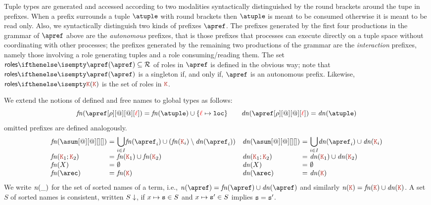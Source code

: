 Tuple types are generated and accessed according to two modalities
syntactically distinguished by the round brackets around the tupe
in prefixes.
%
When a prefix surrounds a tuple $\atuple$ with round brackets then
$\atuple$ is meant to be consumed otherwise it is meant to be read
only.
%
Also, we syntactically distinguish two kinds of prefixes $\apref$.
%
The prefixes generated by the first four productions in the grammar of
$\apref$ above are the \emph{autonomous} prefixes, that is those
prefixes that processes can execute directly on a tuple space without
coordinating with other processes; the prefixes generated by the
remaining two productions of the grammar are the \emph{interaction}
prefixes, namely those involving a role generating tuples and a role
consuming/reading them.
%
The set $\roles \apref \subseteq \roleset$ of roles in $\apref$ is
defined in the obvious way; note that $\roles \apref$ is a singleton
if, and only if, $\apref$ is an autonomous prefix.
%
Likewise, $\roles \aK$ is the set of roles in
$\aK$.

We extend the notions of defined and free names to global types as
follows:
\[
 \fn{\apref[\arole][@][@][\alocvar]}
 = \fn \atuple \cup \{\alocvar \mapsto \asort[loc]\} 
\qquad
 \dn{\apref[\arole][@][@][\alocvar]} 
 = \dn \atuple 
\]
omitted prefixes are defined analogously.
\[
  \begin{array}{ll}
    \begin{array}{l@{\ =\ } ll}
      \fn{\asum[@][@][][]} & \displaystyle{\bigcup_{i\in I}} \fn{\apref_i} \cup (\fn{\aK_i}\setminus\dn{\apref_i})
      \\
      \fn{\aK_1; \aK_2} 
                &
                  \fn{\aK_1}\cup\fn{\aK_2}
      \\
      \fn X & \emptyset
      \\
      \fn \arec & \fn {\aK}
    \end{array}
    \begin{array}{l@{\ =\ } ll}
      \dn{\asum[@][@][][]} & \displaystyle{\bigcup_{i\in I}} \dn{\apref_i} \cup \dn{\aK_i}
      \\
      \dn{\aK_1; \aK_2} 
                           &
                             \dn{\aK_1}\cup\dn{\aK_2}
      \\
      \dn X & \emptyset
      \\
      \dn \arec & \dn {\aK}
    \end{array}
  \end{array}
\]
%
We write ${\it n}(\_)$ for the set of sorted names of a term, i.e.,
$\names \apref = \fn\apref \cup \dn\apref$ and similarly
$\names \aK = \fn\aK \cup \dn\aK$. A set $S$ of sorted names is
consistent, written $S\downarrow$, if $x\mapsto \mathtt{s} \in S$ and
$x\mapsto \mathtt{s}' \in S$ implies $\mathtt{s} = \mathtt{s}'$.
 
